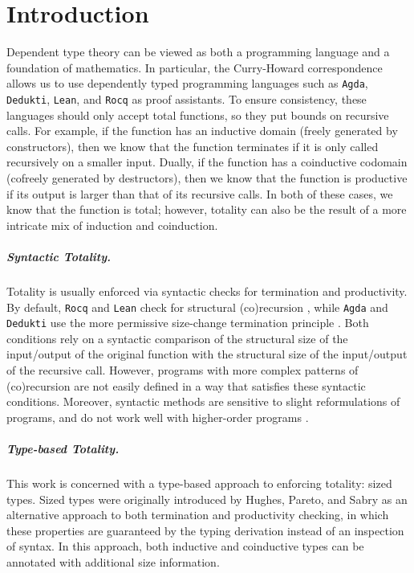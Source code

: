 \section{Introduction}
    \label{sec:intro}
    
Dependent type theory can be viewed as both a programming language and a foundation of mathematics.
In particular, the Curry-Howard correspondence allows us to use dependently typed programming languages such as \texttt{Agda}, \texttt{Dedukti}, \texttt{Lean}, and \texttt{Rocq} as proof assistants.
To ensure consistency, these languages should only accept total functions, so they put bounds on recursive calls.
For example, if the function has an inductive domain (freely generated by constructors), then we know that the function terminates if it is only called recursively on a smaller input.
Dually, if the function has a coinductive codomain (cofreely generated by destructors), then we know that the function is productive if its output is larger than that of its recursive calls.
In both of these cases, we know that the function is total; however, totality can also be the result of a more intricate mix of induction and coinduction.

\subparagraph{Syntactic Totality.}
Totality is usually enforced via syntactic checks for termination and productivity.
By default, \texttt{Rocq} and \texttt{Lean} check for structural (co)recursion \cite{goguen_eliminating_2006,cockx_eliminating_2016,thibodeau_intensional_2020}, while \texttt{Agda} and \texttt{Dedukti} use the more permissive size-change termination principle \cite{size-change}.
Both conditions rely on a syntactic comparison of the structural size of the input/output of the original function with the structural size of the input/output of the recursive call. 
However, programs with more complex patterns of (co)recursion are not easily defined in a way that satisfies these syntactic conditions.
Moreover, syntactic methods are sensitive to slight reformulations of programs, and do not work well with higher-order programs \cite{Abel-inflationary}.

\subparagraph{Type-based Totality.}
This work is concerned with a type-based approach to enforcing totality: sized types.
Sized types were originally introduced by Hughes, Pareto, and Sabry \cite{hughes} as an alternative approach to both termination and productivity checking, in which these properties are guaranteed by the typing derivation instead of an inspection of syntax.
In this approach, both inductive and coinductive types can be annotated with additional size information.

